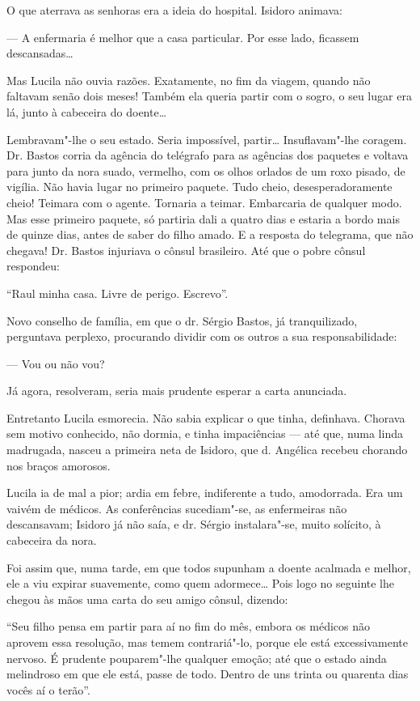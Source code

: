 O que aterrava as senhoras era a ideia do hospital. Isidoro animava:

--- A enfermaria é melhor que a casa particular. Por esse lado, ficassem
descansadas\ldots{}

Mas Lucila não ouvia razões. Exatamente, no fim da viagem, quando não
faltavam senão dois meses! Também ela queria partir com o sogro, o seu
lugar era lá, junto à cabeceira do doente\ldots{}

Lembravam"-lhe o seu estado. Seria impossível, partir\ldots{} Insuflavam"-lhe
coragem. Dr. Bastos corria da agência do telégrafo para as agências dos
paquetes e voltava para junto da nora suado, vermelho, com os olhos
orlados de um roxo pisado, de vigília. Não havia lugar no primeiro
paquete. Tudo cheio, desesperadoramente cheio! Teimara com o agente.
Tornaria a teimar. Embarcaria de qualquer modo. Mas esse primeiro
paquete, só partiria dali a quatro dias e estaria a bordo mais de quinze
dias, antes de saber do filho amado. E a resposta do telegrama, que não
chegava! Dr. Bastos injuriava o cônsul brasileiro. Até que o pobre
cônsul respondeu:

``Raul minha casa. Livre de perigo. Escrevo''.

Novo conselho de família, em que o dr. Sérgio Bastos, já tranquilizado,
perguntava perplexo, procurando dividir com os outros a sua
responsabilidade:

--- Vou ou não vou?

Já agora, resolveram, seria mais prudente esperar a carta anunciada.

Entretanto Lucila esmorecia. Não sabia explicar o que tinha, definhava.
Chorava sem motivo conhecido, não dormia, e tinha impaciências --- até
que, numa linda madrugada, nasceu a primeira neta de Isidoro, que d.
Angélica recebeu chorando nos braços amorosos.

Lucila ia de mal a pior; ardia em febre, indiferente a tudo, amodorrada.
Era um vaivém de médicos. As conferências sucediam"-se, as enfermeiras
não descansavam; Isidoro já não saía, e dr. Sérgio instalara"-se, muito
solícito, à cabeceira da nora.

Foi assim que, numa tarde, em que todos supunham a doente acalmada e
melhor, ele a viu expirar suavemente, como quem adormece\ldots{} Pois logo no
seguinte lhe chegou às mãos uma carta do seu amigo cônsul, dizendo:

``Seu filho pensa em partir para aí no fim do mês, embora os médicos não
aprovem essa resolução, mas temem contrariá"-lo, porque ele está
excessivamente nervoso. É prudente pouparem"-lhe qualquer emoção; até que
o estado ainda melindroso em que ele está, passe de todo. Dentro de uns
trinta ou quarenta dias vocês aí o terão''.


